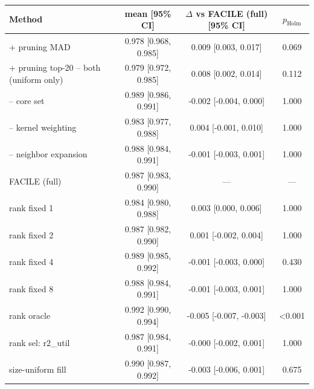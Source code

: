 \begin{tabular}{lccc}
\toprule
Method & mean [95\% CI] & $\Delta$ vs FACILE (full) [95\% CI] & $p_{\mathrm{Holm}}$ \\
\midrule
+ pruning MAD & 0.978 [0.968, 0.985] & 0.009 [0.003, 0.017] & 0.069 \\
+ pruning top-20%
-- both (uniform only) & 0.979 [0.972, 0.985] & 0.008 [0.002, 0.014] & 0.112 \\
-- core set & 0.989 [0.986, 0.991] & -0.002 [-0.004, 0.000] & 1.000 \\
-- kernel weighting & 0.983 [0.977, 0.988] & 0.004 [-0.001, 0.010] & 1.000 \\
-- neighbor expansion & 0.988 [0.984, 0.991] & -0.001 [-0.003, 0.001] & 1.000 \\
FACILE (full) & 0.987 [0.983, 0.990] & --- & --- \\
rank fixed 1 & 0.984 [0.980, 0.988] & 0.003 [0.000, 0.006] & 1.000 \\
rank fixed 2 & 0.987 [0.982, 0.990] & 0.001 [-0.002, 0.004] & 1.000 \\
rank fixed 4 & 0.989 [0.985, 0.992] & -0.001 [-0.003, 0.000] & 0.430 \\
rank fixed 8 & 0.988 [0.984, 0.991] & -0.001 [-0.003, 0.001] & 1.000 \\
rank oracle & 0.992 [0.990, 0.994] & -0.005 [-0.007, -0.003] & <0.001 \\
rank sel: r2_util & 0.987 [0.984, 0.991] & -0.000 [-0.002, 0.001] & 1.000 \\
size-uniform fill & 0.990 [0.987, 0.992] & -0.003 [-0.006, 0.001] & 0.675 \\
\bottomrule
\end{tabular}

